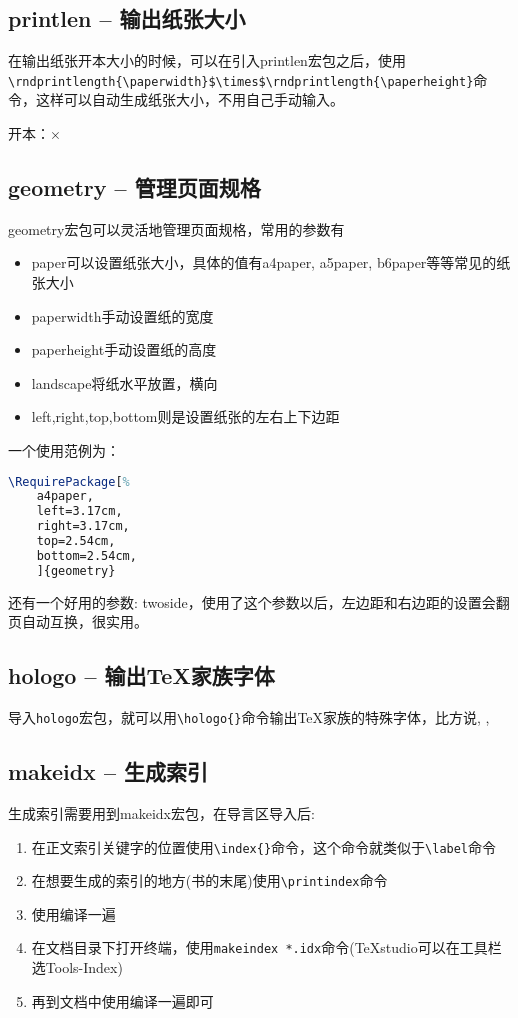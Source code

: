 \subsection{printlen -- 输出纸张大小}
在输出纸张开本大小的时候，可以在引入printlen宏包之后，使用\lstinline|\rndprintlength{\paperwidth}$\times$\rndprintlength{\paperheight}|命令，这样可以自动生成纸张大小，不用自己手动输入。
\begin{tcolorbox}[title=效果,colframe=red]
	开本：\rndprintlength{\paperwidth}$\times$\rndprintlength{\paperheight}
\end{tcolorbox}

\subsection{geometry -- 管理页面规格}
geometry宏包可以灵活地管理页面规格，常用的参数有
\begin{itemize}
	\item paper可以设置纸张大小，具体的值有a4paper, a5paper, b6paper等等常见的纸张大小
	\item paperwidth手动设置纸的宽度
	\item paperheight手动设置纸的高度
	\item landscape将纸水平放置，横向
	\item left,right,top,bottom则是设置纸张的左右上下边距
\end{itemize}
一个使用范例为：
\begin{lstlisting}[language=TeX]
	\RequirePackage[%
	a4paper,
	left=3.17cm,
	right=3.17cm,
	top=2.54cm,
	bottom=2.54cm,
	]{geometry}
\end{lstlisting}
还有一个好用的参数: twoside，使用了这个参数以后，左边距和右边距的设置会翻页自动互换，很实用。


\subsection{hologo -- 输出\TeX{}家族字体}
导入\verb|hologo|宏包，就可以用\lstinline|\hologo{}|命令输出\TeX{}家族的特殊字体，比方说, , 

\subsection{makeidx -- 生成索引}
生成索引需要用到makeidx宏包，在导言区导入后:
\begin{enumerate}
	\item	在正文索引关键字的位置使用\lstinline|\index{}|命令，这个命令就类似于\lstinline|\label|命令
	\item 在想要生成的索引的地方(书的末尾)使用\lstinline|\printindex|命令
	\item 使用编译一遍
	\item 在文档目录下打开终端，使用\lstinline|makeindex *.idx|命令(TeXstudio可以在工具栏选Tools-Index)
	\item 再到文档中使用编译一遍即可
\end{enumerate}

